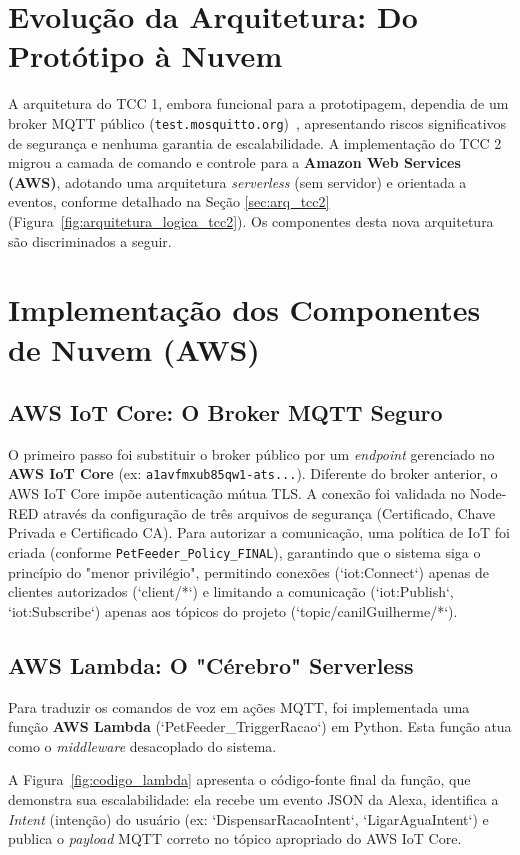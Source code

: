 \section{Evolução da Arquitetura: Do Protótipo à Nuvem}
A arquitetura do TCC 1, embora funcional para a prototipagem, dependia de um broker MQTT público (\texttt{test.mosquitto.org})~\cite{aws_alexa_iot}, apresentando riscos significativos de segurança e nenhuma garantia de escalabilidade.
A implementação do TCC 2 migrou a camada de comando e controle para a \textbf{Amazon Web Services (AWS)}, adotando uma arquitetura \textit{serverless} (sem servidor) e orientada a eventos, conforme detalhado na Seção \ref{sec:arq_tcc2} (Figura~\ref{fig:arquitetura_logica_tcc2}).
Os componentes desta nova arquitetura são discriminados a seguir.

\section{Implementação dos Componentes de Nuvem (AWS)}

\subsection{AWS IoT Core: O Broker MQTT Seguro}
O primeiro passo foi substituir o broker público por um \textit{endpoint} gerenciado no \textbf{AWS IoT Core} (ex: \texttt{a1avfmxub85qw1-ats...}).
Diferente do broker anterior, o AWS IoT Core impõe autenticação mútua TLS.
A conexão foi validada no Node-RED através da configuração de três arquivos de segurança (Certificado, Chave Privada e Certificado CA).
Para autorizar a comunicação, uma política de IoT foi criada (conforme \texttt{PetFeeder\_Policy\_FINAL}), garantindo que o sistema siga o princípio do "menor privilégio", permitindo conexões (`iot:Connect`) apenas de clientes autorizados (`client/*`) e limitando a comunicação (`iot:Publish`, `iot:Subscribe`) apenas aos tópicos do projeto (`topic/canilGuilherme/*`).
\subsection{AWS Lambda: O "Cérebro" Serverless}
Para traduzir os comandos de voz em ações MQTT, foi implementada uma função \textbf{AWS Lambda} (`PetFeeder\_TriggerRacao`) em Python.
Esta função atua como o \textit{middleware} desacoplado do sistema.

A Figura~\ref{fig:codigo_lambda} apresenta o código-fonte final da função, que demonstra sua escalabilidade: ela recebe um evento JSON da Alexa, identifica a \textit{Intent} (intenção) do usuário (ex: `DispensarRacaoIntent`, `LigarAguaIntent`) e publica o \textit{payload} MQTT correto no tópico apropriado do AWS IoT Core.







